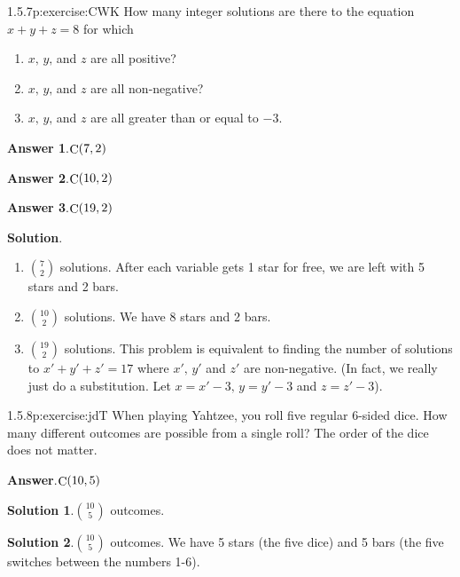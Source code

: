 \documentclass[twoside,11pt,]{book}
\newcommand{\blocktitlefont}{\relax}
\numberwithin{equation}{chapter}
\begin{document}
\begin{divisionsolution}{1.5.7}{}{p:exercise:CWK}%
How many integer solutions are there to the equation \(x + y + z = 8\) for which%
\begin{enumerate}[label=(\alph*)]
\item{}\(x\text{,}\) \(y\text{,}\) and \(z\) are all positive?%
\item{}\(x\text{,}\) \(y\text{,}\) and \(z\) are all non-negative?%
\item{}\(x\text{,}\) \(y\text{,}\) and \(z\) are all greater than or equal to \(-3\text{.}\)%
\end{enumerate}
%
\par\smallskip%
\noindent\textbf{\blocktitlefont Answer 1}.\quad{}\(\mathop{\rm C}\nolimits\!\left(7,2\right)\)%
\par\smallskip%
\noindent\textbf{\blocktitlefont Answer 2}.\quad{}\(\mathop{\rm C}\nolimits\!\left(10,2\right)\)%
\par\smallskip%
\noindent\textbf{\blocktitlefont Answer 3}.\quad{}\(\mathop{\rm C}\nolimits\!\left(19,2\right)\)%
\par\smallskip%
\noindent\textbf{\blocktitlefont Solution}.\quad{}%
\begin{enumerate}[label=(\alph*)]
\item{}\({7 \choose 2}\) solutions. After each variable gets 1 star for free, we are left with 5 stars and 2 bars.%
\item{}\({10 \choose 2}\) solutions. We have 8 stars and 2 bars.%
\item{}\({19 \choose 2}\) solutions. This problem is equivalent to finding the number of solutions to \(x' + y' + z' = 17\) where \(x'\text{,}\) \(y'\) and \(z'\) are non-negative. (In fact, we really just do a substitution. Let \(x = x'- 3\text{,}\) \(y = y' - 3\) and \(z = z' - 3\)).%
\end{enumerate}
%
\end{divisionsolution}%
\begin{divisionsolution}{1.5.8}{}{p:exercise:jdT}%
When playing Yahtzee, you roll five regular 6-sided dice. How many different outcomes are possible from a single roll? The order of the dice does not matter.%
\par\smallskip%
\noindent\textbf{\blocktitlefont Answer}.\quad{}\(\mathop{\rm C}\nolimits\!\left(10,5\right)\)%
\par\smallskip%
\noindent\textbf{\blocktitlefont Solution 1}.\quad{}\({10 \choose 5}\) outcomes.%
\par\smallskip%
\noindent\textbf{\blocktitlefont Solution 2}.\quad{}\({10 \choose 5}\) outcomes. We have 5 stars (the five dice) and 5 bars (the five switches between the numbers 1-6).%
\end{divisionsolution}%
\end{document}
